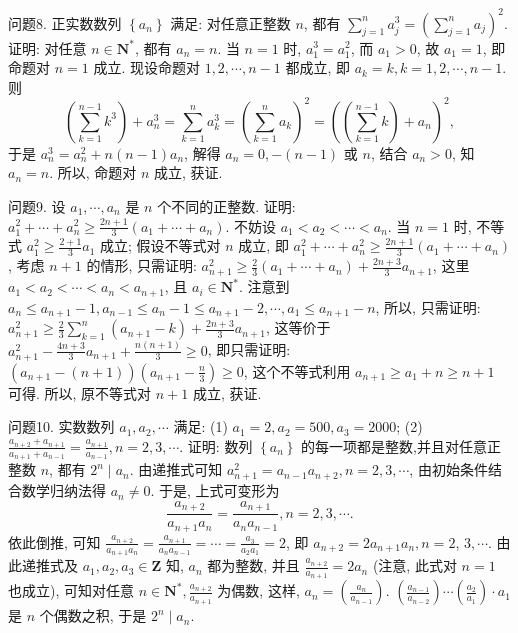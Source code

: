 问题8. 正实数数列 $\left\{a_n\right\}$ 满足: 对任意正整数 $n$, 都有 $\sum_{j=1}^n a_j^3=\left(\sum_{j=1}^n a_j\right)^2$.
证明: 对任意 $n \in \mathbf{N}^*$, 都有 $a_n=n$.
当 $n=1$ 时, $a_1^3=a_1^2$, 而 $a_1>0$, 故 $a_1=1$, 即命题对 $n=1$ 成立.
现设命题对 $1,2, \cdots, n-1$ 都成立, 即 $a_k=k, k=1,2, \cdots, n-1$. 则
$$
\left(\sum_{k=1}^{n-1} k^3\right)+a_n^3=\sum_{k=1}^n a_k^3=\left(\sum_{k=1}^n a_k\right)^2=\left(\left(\sum_{k=1}^{n-1} k\right)+a_n\right)^2,
$$
于是 $a_n^3=a_n^2+n(n-1) a_n$, 解得 $a_n=0,-(n-1)$ 或 $n$, 结合 $a_n>0$, 知 $a_n= n$. 所以, 命题对 $n$ 成立, 获证.



问题9. 设 $a_1, \cdots, a_n$ 是 $n$ 个不同的正整数.
证明: $a_1^2+\cdots+a_n^2 \geqslant \frac{2 n+1}{3}\left(a_1+\cdots+a_n\right)$.
不妨设 $a_1<a_2<\cdots<a_n$. 当 $n=1$ 时, 不等式 $a_1^2 \geqslant \frac{2+1}{3} a_1$ 成立; 假设不等式对 $n$ 成立, 即 $a_1^2+\cdots+a_n^2 \geqslant \frac{2 n+1}{3}\left(a_1+\cdots+a_n\right)$, 考虑 $n+1$ 的情形, 只需证明: $a_{n+1}^2 \geqslant \frac{2}{3}\left(a_1+\cdots+a_n\right)+\frac{2 n+3}{3} a_{n+1}$, 这里 $a_1<a_2<\cdots< a_n<a_{n+1}$, 且 $a_i \in \mathbf{N}^*$.
注意到 $a_n \leqslant a_{n+1}-1, a_{n-1} \leqslant a_n-1 \leqslant a_{n+1}-2, \cdots, a_1 \leqslant a_{n+1}-n$, 所以, 只需证明: $a_{n+1}^2 \geqslant \frac{2}{3} \sum_{k=1}^n\left(a_{n+1}-k\right)+\frac{2 n+3}{3} a_{n+1}$, 这等价于 $a_{n+1}^2-\frac{4 n+3}{3} a_{n+1}+ \frac{n(n+1)}{3} \geqslant 0$, 即只需证明: $\left(a_{n+1}-(n+1)\right)\left(a_{n+1}-\frac{n}{3}\right) \geqslant 0$, 这个不等式利用 $a_{n+1} \geqslant a_1+n \geqslant n+1$ 可得.
所以, 原不等式对 $n+1$ 成立, 获证.



问题10. 实数数列 $a_1, a_2, \cdots$ 满足:
(1) $a_1=2, a_2=500, a_3=2000$;
(2) $\frac{a_{n+2}+a_{n+1}}{a_{n+1}+a_{n-1}}=\frac{a_{n+1}}{a_{n-1}}, n=2,3, \cdots$.
证明: 数列 $\left\{a_n\right\}$ 的每一项都是整数,并且对任意正整数 $n$, 都有 $2^n \mid a_n$.
由递推式可知 $a_{n+1}^2=a_{n-1} a_{n+2}, n=2,3, \cdots$, 由初始条件结合数学归纳法得 $a_n \neq 0$. 于是, 上式可变形为
$$
\frac{a_{n+2}}{a_{n+1} a_n}=\frac{a_{n+1}}{a_n a_{n-1}}, n=2,3, \cdots .
$$
依此倒推, 可知 $\frac{a_{n+2}}{a_{n+1} a_n}=\frac{a_{n+1}}{a_n a_{n-1}}=\cdots=\frac{a_3}{a_2 a_1}=2$, 即 $a_{n+2}=2 a_{n+1} a_n, n=2$, $3, \cdots$. 由此递推式及 $a_1, a_2, a_3 \in \mathbf{Z}$ 知, $a_n$ 都为整数, 并且 $\frac{a_{n+2}}{a_{n+1}}=2 a_n$ (注意, 此式对 $n=1$ 也成立), 可知对任意 $n \in \mathbf{N}^*, \frac{a_{n+2}}{a_{n+1}}$ 为偶数, 这样, $a_n=\left(\frac{a_n}{a_{n-1}}\right)$. $\left(\frac{a_{n-1}}{a_{n-2}}\right) \cdots\left(\frac{a_2}{a_1}\right) \cdot a_1$ 是 $n$ 个偶数之积, 于是 $2^n \mid a_n$.



